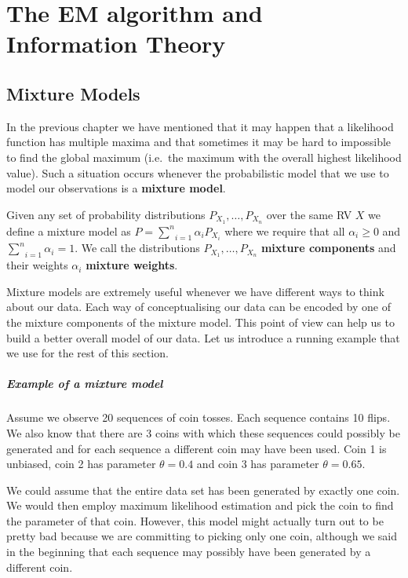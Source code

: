 \chapter{The EM algorithm and Information Theory}

\section{Mixture Models}\label{sec:mixtureModels}

In the previous chapter we have mentioned that it may happen that a likelihood function has multiple 
maxima and that sometimes it may be hard to impossible to find the global maximum (i.e.\ the maximum
with the overall highest likelihood value). Such a situation occurs whenever the probabilistic model
that we use to model our observations is a \textbf{mixture model}.

\begin{Definition}\label{def:mixtureModel}
Given any set of probability distributions $ P_{X_1}, \ldots, P_{X_n} $ over the same RV $ X $ 
we define a mixture model as
$ P = \underset{i=1}{\overset{n}{\sum}} \alpha_{i}P_{X_i} $
where we require that all $ \alpha_{i} \geq 0$ and 
$ \underset{i=1}{\overset{n}{\sum}} \alpha_{i} = 1 $.
We call the distributions $ P_{X_1}, \ldots, P_{X_n} $ \textbf{mixture components} and their weights
$ \alpha_{i} $ \textbf{mixture weights}.
\end{Definition}

Mixture models are extremely useful whenever we have different ways to think about our data. Each way
of conceptualising our data can be encoded by one of the mixture components of the mixture model.
This point of view can help us to build a better overall model of our data. Let us introduce a running example that
we use for the rest of this section. 

\paragraph{Example of a mixture model} Assume we observe 20 sequences of coin tosses. Each sequence
contains 10 flips. We also know that there are 3 coins with which these sequences could possibly be
generated and for each sequence a different coin may have been used. Coin 1 is unbiased, coin 2 has
parameter $ \theta = 0.4 $ and coin 3 has parameter $ \theta = 0.65 $. 
 
We could assume that the entire data set has been generated by exactly one coin. We would then employ maximum likelihood estimation 
and pick the coin to find the parameter of that coin. However, this model might actually turn out to be
pretty bad because we are committing to picking only one coin, although we said in the beginning that
each sequence may possibly have been generated by a different coin. 

